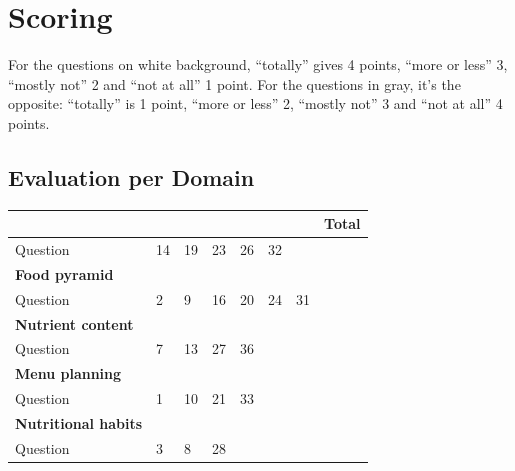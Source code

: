 \documentclass[../main.tex]{subfiles}
\begin{document}
\section{Scoring}

For the questions on white background, ``totally'' gives 4 points, ``more or less'' 3, ``mostly not'' 2 and ``not at all'' 1 point.
For the questions in gray, it's the opposite:  ``totally'' is 1 point, ``more or less'' 2, ``mostly not'' 3 and ``not at all'' 4 points.

\vspace{2mm}

\subsection{Evaluation per Domain}

\begin{tabular}{l|p{10mm}|p{10mm}|p{10mm}|p{10mm}|p{10mm}|p{10mm}||l|}
  & & & & & & & \textbf{Total} \\ \hline
  \cellcolor{lightgray} Question & \cellcolor{lightgray} 14 &
  \cellcolor{lightgray} 19 & \cellcolor{lightgray} 23 &
  \cellcolor{lightgray} 26 & \cellcolor{lightgray} 32 &
& \\
  \textbf{Food pyramid} & & & & & & & \\ [2ex] \hline
  \cellcolor{lightgray} Question & \cellcolor{lightgray} 2
  & \cellcolor{lightgray} 9 & \cellcolor{lightgray} 16 &
  \cellcolor{lightgray} 20 & \cellcolor{lightgray} 24 &
  \cellcolor{lightgray} 31 & \\
  \textbf{Nutrient content} & & & & & & & \\[2ex] \hline
  \cellcolor{lightgray} Question & \cellcolor{lightgray} 7 &
  \cellcolor{lightgray} 13 & \cellcolor{lightgray} 27 &
  \cellcolor{lightgray} 36 & & & \\
  \textbf{Menu planning} & & & & & & & \\[2ex] \cline{1-5} \cline{8-8}
  \cellcolor{lightgray} Question & \cellcolor{lightgray} 1 & \cellcolor{lightgray} 10
  & \cellcolor{lightgray} 21 & \cellcolor{lightgray} 33 & 
  &   & \\
  \textbf{Nutritional habits} & & & & & & & \\[2ex] \cline{1-5} \cline{8-8}
  \cellcolor{lightgray} Question & \cellcolor{lightgray} 3 & \cellcolor{lightgray} 8 &
  \cellcolor{lightgray} 28 & & & & \\


\end{tabular}
\end{document}
